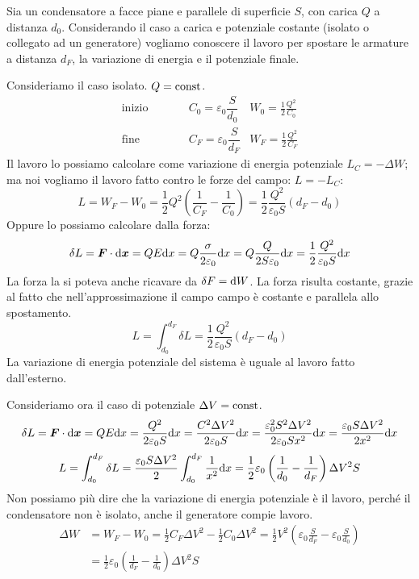 \begin{Es}
  Sia un condensatore a facce piane e parallele di superficie $S$, con carica $Q$ a distanza $d_0$. Considerando il caso a carica e potenziale costante (isolato o collegato ad un generatore) vogliamo conoscere il lavoro per spostare le armature a distanza $d_F$, la variazione di energia e il potenziale finale.

  Consideriamo il caso isolato. $Q=\text{const}$.
  \begin{equation*}
    \begin{aligned}
      \text{inizio} & \qquad & C_0=\varepsilon_0\dfrac{S}{d_0} & W_0 = \frac{1}{2}\frac{Q^2}{C_0}
      \\
      \text{fine}   & \qquad & C_F=\varepsilon_0\dfrac{S}{d_F} & W_F = \frac{1}{2}\frac{Q^2}{C_F}
    \end{aligned}
  \end{equation*}
  Il lavoro lo possiamo calcolare come variazione di energia potenziale $L_C=-\Delta W$; ma noi vogliamo il lavoro fatto contro le forze del campo: $L=-L_C$:
  \[
    L=W_F-W_0=\frac{1}{2}Q^2\left(\frac{1}{C_F}-\frac{1}{C_0}\right) = \frac{1}{2}\frac{Q^2}{\varepsilon_0 S}\left(d_F-d_0\right)
  \]
  Oppure lo possiamo calcolare dalla forza:
  \[\delta L=\boldsymbol{F}\cdot\mathrm{d} \boldsymbol{x}=QE\mathrm{d} x=Q\frac{\sigma}{2\varepsilon_0}\mathrm{d} x=Q\frac{Q}{2S\varepsilon_0}\mathrm{d} x=\frac{1}{2}\frac{Q^2}{\varepsilon_0 S}\mathrm{d} x\]
  La forza la si poteva anche ricavare da $\delta F=\mathrm{d} W$. La forza risulta costante, grazie al fatto che nell'approssimazione il campo campo è costante e parallela allo spostamento.
  \[L=\int_{d_0}^{d_F}\delta L=\frac{1}{2}\frac{Q^2}{\varepsilon_0 S}(d_F-d_0)\]
  La variazione di energia potenziale del sistema è uguale al lavoro fatto dall'esterno.

  Consideriamo ora il caso di potenziale $\Delta V=\text{const}$.
  \[\delta L=\boldsymbol{F}\cdot\mathrm{d} \boldsymbol{x}=QE\mathrm{d} x=\frac{Q^2}{2\varepsilon_0S}\mathrm{d} x=\frac{C^2\Delta V^2}{2\varepsilon_0S}\mathrm{d} x=\frac{\varepsilon_0^2S^2\Delta V^2}{2\varepsilon_0Sx^2}\mathrm{d} x=\frac{\varepsilon_0S\Delta V^2}{2x^2}\mathrm{d} x\]
  \[L=\int_{d_0}^{d_F}\delta L=\frac{\varepsilon_0S\Delta V^2}{2}\int_{d_0}^{d_F}\frac{1}{x^2}\mathrm{d} x=\frac{1}{2}\varepsilon_0\left(\frac{1}{d_0}-\frac{1}{d_F}\right)\Delta V^2S\]
  Non possiamo più dire che la variazione di energia potenziale è il lavoro, perché il condensatore non è isolato, anche il generatore compie lavoro.
  \begin{align*}
    \Delta W & =W_F-W_0=\frac{1}{2}C_F\Delta V^2-\frac{1}{2}C_0\Delta V^2=\frac{1}{2}V^2\left(\varepsilon_0\frac{S}{d_F}-\varepsilon_0\frac{S}{d_0}\right) \\
             & =\frac{1}{2}\varepsilon_0\left(\frac{1}{d_F}-\frac{1}{d_0}\right)\Delta V^2S
  \end{align*}
\end{Es}

